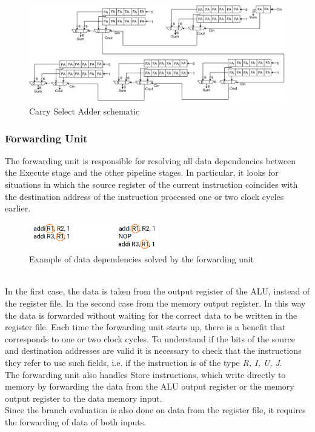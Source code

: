\begin{figure}[htbp]
	\centering
	\includegraphics[width=1\textwidth]{sec2/images/csa_full2.png}
	\caption{Carry Select Adder schematic}
	\label{fig:CSA_full}
\end{figure}

\subsubsection{Forwarding Unit}
The forwarding unit is responsible for resolving all data dependencies between the Execute stage and the other pipeline stages. In particular, it looks for situations in which the source register of the current instruction coincides with the destination address of the instruction processed one or two clock cycles earlier.
\begin{figure}[htbp]
	\centering
	\includegraphics[width=0.5\textwidth]{sec2/images/data_dependency.png}
	\caption{Example of data dependencies solved by the forwarding unit}
	\label{fig:zero_skipping}
\end{figure}
\\In the first case, the data is taken from the output register of the ALU, instead of the register file. In the second case from the memory output register. In this way the data is forwarded without waiting for the correct data to be written in the register file. Each time the forwarding unit starts up, there is a benefit that corresponds to one or two clock cycles. To understand if the bits of the source and destination addresses are valid it is necessary to check that the instructions they refer to use such fields, i.e. if the instruction is of the type \textit{R, I, U, J}.\\
The forwarding unit also handles Store instructions, which write directly to memory by forwarding the data from the ALU output register or the memory output register to the data memory input.\\
Since the branch evaluation is also done on data from the register file, it requires the forwarding of data of both inputs.
